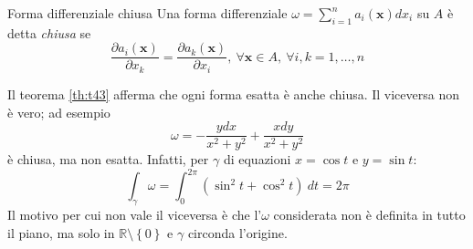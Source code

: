 \documentclass[10pt, a4paper]{scrartcl}
\theoremstyle{definition}
\numberwithin{esempio}{section}
\theoremstyle{definition}
\numberwithin{obs}{section}
\numberwithin{nota}{section}
\numberwithin{equation}{subsection}
\begin{document}
\begin{definizione}
	{Forma differenziale chiusa}{}
	Una forma differenziale $\omega = \sum_{i=1}^{n} a_i(\mathbf{x} ) dx_i$ su $A$ \`e detta \textit{chiusa} se
	\begin{equation}
		\frac{\partial a_i(\mathbf{x} )}{\partial x_k}  = \frac{\partial a_k(\mathbf{x} )}{\partial x_i} , \ \forall \mathbf{x} \in A, \ \forall i,k = 1 ,\ldots,n
	\end{equation}
\end{definizione}
Il teorema \ref{th:t43} afferma che ogni forma esatta \`e anche chiusa.
Il viceversa non \`e vero; ad esempio
\[
\omega =- \frac{ydx}{x^2 + y^2} + \frac{xdy}{x^2 + y^2}
\] 
\`e chiusa, ma non esatta. 
Infatti, per $\gamma$ di equazioni $x = \cos t$ e $y = \sin t$:
\[
\int_{\gamma} \omega = \int_{0} ^{2\pi} (\sin^2 t + \cos^2 t) \ dt = 2\pi
\] 
Il motivo per cui non vale il viceversa \`e che l'$\omega$ considerata non \`e definita in tutto il piano, ma solo in $\mathbb{R}\setminus\left\{ 0 \right\} $ e $\gamma$ circonda l'origine.
\end{document}
